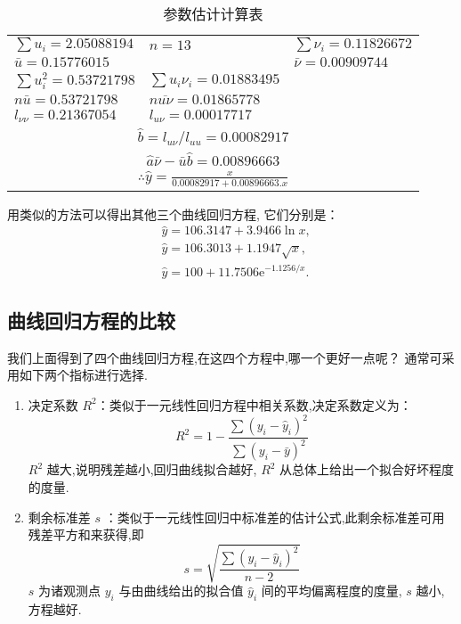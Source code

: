 \begin{table}[!htb]
  \renewcommand*{\arraystretch}{1.5}
    \centering
    \caption{参数估计计算表}
    \begin{tabularx}{\linewidth}{ZZZ}
      \toprule
     $\sum u_i=2.050 88194$   &    $n=13$     &  $\sum \nu_i=0.11826672$  \\
     $\bar{u}=0.157 76015$   &       &  $ \bar{\nu} =0.009 097 44$  \\
     $\sum u_{i}^{2}=0.537 217 98$   &    $\sum u_i\nu_i=0.01883495$     &  \\
     $n\bar{u}=0.537 21798$   &   $n\overline{u\nu}=0.01865778$      &  \\
     $l_{\nu\nu}=0.21367054$   &   $l_{u\nu}=0.000 17717$      &  \\
         \\
         \\
         \\[2ex]
        \bottomrule
    \end{tabularx}%
    \label{tab:8.5.3}%
\end{table}%
用类似的方法可以得出其他三个曲线回归方程, 它们分别是：
\begin{align*}
  & \hat{y}=106.3147+3.9466 \ln x, \\
  & \hat{y}=106.3013+1.1947 \sqrt{x}, \\
  & \hat{y}=100+11.7506 \mathrm{e}^{-1.1256 / x}.
\end{align*}

\subsection{曲线回归方程的比较}\label{ssec:8.5.3}

我们上面得到了四个曲线回归方程,在这四个方程中,哪一个更好一点呢？
通常可采用如下两个指标进行选择.
\begin{enumerate}
    \item 决定系数 $R^2$：类似于一元线性回归方程中相关系数,决定系数定义为：
    \begin{equation}
    R^{2}=1-\frac{\sum\left(y_{i}-\hat{y}_{i}\right)^{2}}{\sum\left(y_{i}-\bar{y}\right)^{2}}\label{eq:8.5.5}
    \end{equation} $R^2$ 越大,说明残差越小,回归曲线拟合越好, $R^2$ 从总体上给出一个拟合好坏程度的度量.
    \item 剩余标准差 $s$ ：类似于一元线性回归中标准差的估计公式,此剩余标准差可用残差平方和来获得,即
    \begin{equation}
    s=\sqrt{\frac{\sum (y_i-\hat{y}_i)^2}{n-2}}\label{eq:8.5.6}
    \end{equation}
 $s$ 为诸观测点 $y_i$ 与由曲线给出的拟合值 $\hat{y}_i$ 间的平均偏离程度的度量, $s$ 越小,方程越好.
\end{enumerate}

